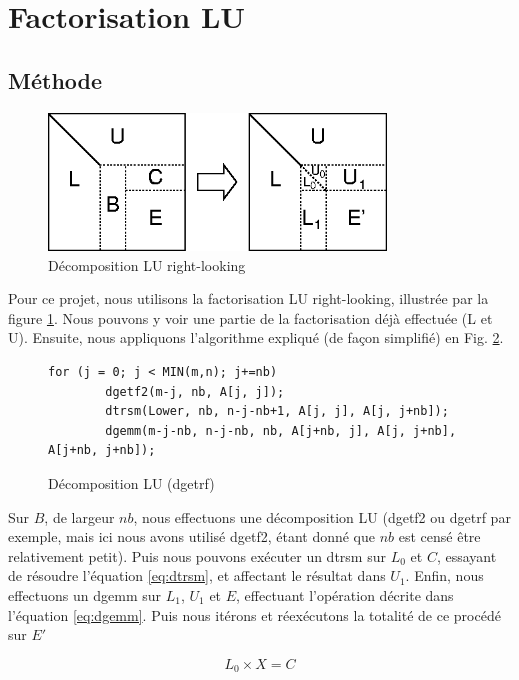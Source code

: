 \section{Factorisation LU} %
\label{sec:factorisation_lu}

\subsection{Méthode} %
\label{sub:methode}

\begin{figure}[H]
\centering
\includegraphics[width=0.8\textwidth]{lu}
\caption{Décomposition LU right-looking}
\label{fig:lu}
\end{figure}

Pour ce projet, nous utilisons la factorisation LU right-looking, illustrée par la figure \ref{fig:lu}. Nous pouvons y voir une partie de la factorisation déjà effectuée (L et U). Ensuite, nous appliquons l'algorithme expliqué (de façon simplifié) en Fig. \ref{code:lu}.

\begin{figure}[H]
\begin{lstlisting}
for (j = 0; j < MIN(m,n); j+=nb)
		dgetf2(m-j, nb, A[j, j]);
		dtrsm(Lower, nb, n-j-nb+1, A[j, j], A[j, j+nb]);
		dgemm(m-j-nb, n-j-nb, nb, A[j+nb, j], A[j, j+nb], A[j+nb, j+nb]);
\end{lstlisting}
\caption{Décomposition LU (dgetrf)}
\label{code:lu}
\end{figure}
Sur $B$, de largeur $nb$, nous effectuons une décomposition LU (dgetf2 ou dgetrf par exemple, mais ici nous avons utilisé dgetf2, étant donné que $nb$ est censé être relativement petit). Puis nous pouvons exécuter un dtrsm sur $L_0$ et $C$, essayant de résoudre l'équation \ref{eq:dtrsm}, et affectant le résultat dans $U_1$. Enfin, nous effectuons un dgemm sur $L_1$, $U_1$ et $E$, effectuant l'opération décrite dans l'équation \ref{eq:dgemm}. Puis nous itérons et réexécutons la totalité de ce procédé sur $E'$

\begin{equation}
\label{eq:dtrsm}
L_0 \times X = C
\end{equation}

